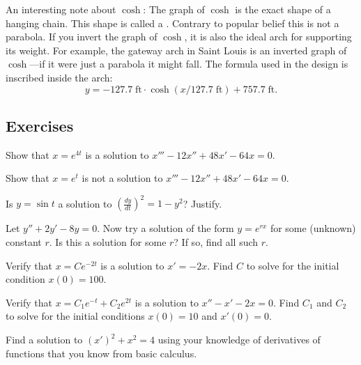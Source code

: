 An interesting note about $\cosh$:  The graph of $\cosh$ is the exact shape
of a hanging chain.  This shape is called
a \emph{}.
Contrary to popular belief this is not a
parabola.  If you invert the graph of $\cosh$, it is also the ideal arch for
supporting its weight.
For example, the gateway arch in Saint Louis is an inverted graph of
$\cosh$---if it were just a parabola it might fall.  The formula
used in the design is
inscribed inside the arch:
\begin{equation*}
y = -127.7 \; \textrm{ft} \cdot \cosh({x / 127.7  \; \textrm{ft}}) + 757.7 \;
\textrm{ft} .
\end{equation*}


\subsection{Exercises}

\begin{exercise}
Show that $x = e^{4t}$ is a solution to $x'''-12 x'' + 48 x' - 64 x = 0$.
\end{exercise}

\begin{exercise}
Show that $x = e^{t}$ is not a solution to $x'''-12 x'' + 48 x' - 64 x = 0$.
\end{exercise}

\begin{exercise}
Is $y = \sin t$ a solution to ${\left( \frac{dy}{dt} \right)}^2 = 1 - y^2$?
Justify.
\end{exercise}

\begin{exercise}
Let $y'' + 2y' - 8y = 0$.  Now try a solution of the form $y = e^{rx}$ for
some (unknown) constant $r$.  Is this a solution
for some $r$?  If so, find all such $r$.
\end{exercise}

\begin{exercise}
Verify that $x = C e^{-2t}$ is a solution to $x' = -2x$.
Find $C$ to solve for the initial condition $x(0) = 100$.
\end{exercise}

\begin{exercise}
Verify that $x = C_1 e^{-t} + C_2 e^{2t}$ is a solution to $x'' - x' -2 x =
0$.  Find $C_1$ and $C_2$ to solve for the initial conditions $x(0) = 10$
and $x'(0) = 0$.
\end{exercise}

\begin{exercise}
Find a solution to
${(x')}^2 + x^2 = 4$
using your knowledge of derivatives of functions that you
know from basic calculus.
\end{exercise}

